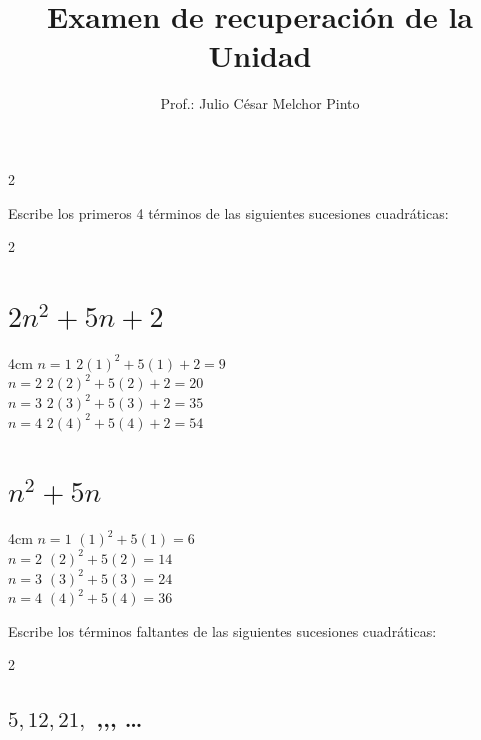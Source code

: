 \documentclass[12pt,addpoints]{evalua}
\title{Examen de {\color{brown}recuperación} de la Unidad}
\author{Prof.: Julio César Melchor Pinto}
\begin{document}
\begin{multicols}{2}
    
    
\end{multicols}
\begin{questions}\large
    \question[10] Escribe los primeros 4 términos de las siguientes sucesiones cuadráticas:

    \begin{multicols}{2}
        \begin{parts}
            \part { \Large$2n^2+5n+2$} \hfill \fillin[$9,20,35,54$][0cm]

            \begin{solutionbox}{4cm}
                $n=1$ \quad $2(1)^2+5(1)+2=9$ \\
                $n=2$ \quad $2(2)^2+5(2)+2=20$ \\
                $n=3$ \quad $2(3)^2+5(3)+2=35$ \\
                $n=4$ \quad $2(4)^2+5(4)+2=54$
            \end{solutionbox}

            \part {\Large $n^2+5n$} \hfill \fillin[$6,14,24,36$][0cm]

            \begin{solutionbox}{4cm}
                $n=1$ \quad $(1)^2+5(1)=6$ \\
                $n=2$ \quad $(2)^2+5(2)=14$ \\
                $n=3$ \quad $(3)^2+5(3)=24$ \\
                $n=4$ \quad $(4)^2+5(4)=36$
            \end{solutionbox}
        \end{parts}
    \end{multicols}

    \question[10] Escribe los términos faltantes de las siguientes sucesiones cuadráticas:

    \begin{multicols}{2}
        \begin{parts}
            \part { \Large$5,12,21,$ \fillin[32][0.5cm],\fillin[45][0.5cm],\fillin[60][0.5cm], \dots}


\end{parts}
\end{multicols}
\end{questions}
\end{document}
